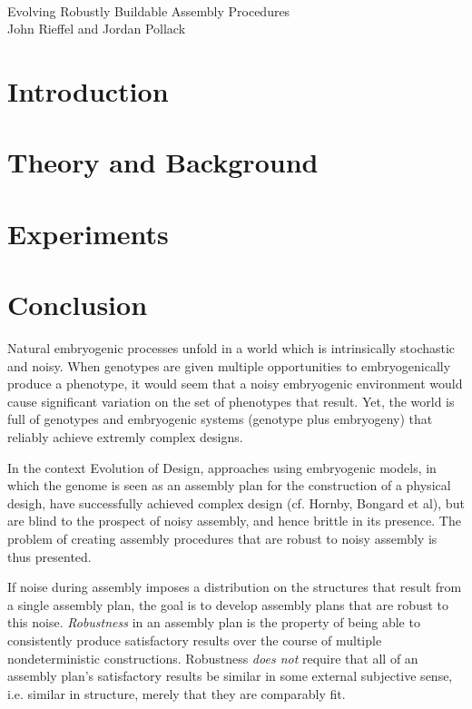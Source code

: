 \documentclass[11pt]{article}
\begin{document}
\ \\
\newcommand{\mrk}{Keijzer}
\newcommand{\rab}{``{\em Representation and Behavior}''}
\begin{center}
\Large Evolving Robustly Buildable Assembly Procedures\\

John Rieffel and Jordan Pollack
\end{center}

\section{Introduction}
\section{Theory and Background}
\section{Experiments}
\section{Conclusion}
Natural embryogenic processes unfold in a world which is intrinsically
stochastic and noisy.  When genotypes are given multiple opportunities
to embryogenically produce a phenotype,  it would seem that a noisy
embryogenic environment would cause significant variation on the set of
phenotypes that result.  Yet, the world is full of genotypes and
embryogenic systems (genotype plus embryogeny) that reliably achieve
extremly complex designs.  

In the context Evolution of Design, approaches using embryogenic
models, in which the genome is seen as an assembly plan for the
construction of a physical desigh,  have successfully achieved
complex design (cf. Hornby, Bongard et al), but are blind to the
prospect of noisy assembly, and hence brittle in its presence.  The
problem of creating assembly procedures that are robust to noisy
assembly is thus presented.

If noise during assembly imposes a distribution on the structures that 
result from a single assembly plan, the goal is to develop assembly
plans that are robust to this noise.  {\em Robustness} in an assembly
plan is the property of being able to consistently produce
satisfactory results over the course of multiple nondeterministic
constructions. Robustness {\em does not} require that all of an assembly
plan's satisfactory results be similar in some external subjective
sense, i.e. similar in structure, merely that they are comparably
fit.
\end{document}

